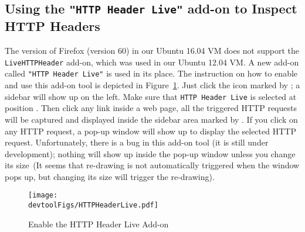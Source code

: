
\newcommand{\devtoolFigs}{../Web_Common/Figs}


\subsection{Using the \texttt{"HTTP Header Live"} add-on to Inspect HTTP Headers}
\label{web:sec:httpheaderlive}


The version of Firefox (version 60) in our Ubuntu 16.04 VM does not support the
\texttt{LiveHTTPHeader} add-on, which was used in our Ubuntu 12.04 VM. 
A new add-on called \texttt{"HTTP Header Live"} is used in its place. 
The instruction on how to enable and use this add-on tool
is depicted in Figure~\ref{web:fig:httpheader}. Just click the icon marked
by ; a sidebar will show up on the left. Make sure that
\texttt{HTTP Header Live} is selected at position . Then click
any link inside a web page, all the triggered HTTP requests will be
captured and displayed inside the sidebar area marked by .
If you click on any HTTP request, a pop-up window will show up to display
the selected HTTP request. Unfortunately, there is a bug in this add-on
tool (it is still under development); nothing will show up inside the
pop-up window unless you change its size~(It seems that re-drawing
is not automatically triggered when the window pops up, but changing its
size will trigger the re-drawing).


\begin{figure}[htb]
\begin{center}
\texttt{[image: \\devtoolFigs/HTTPHeaderLive.pdf]}
\end{center}
\caption{Enable the HTTP Header Live Add-on}
\label{web:fig:httpheader}
\end{figure}




